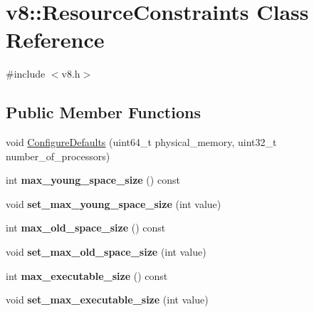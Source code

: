 \hypertarget{classv8_1_1_resource_constraints}{}\section{v8\+:\+:Resource\+Constraints Class Reference}
\label{classv8_1_1_resource_constraints}


{\ttfamily \#include $<$v8.\+h$>$}

\subsection*{Public Member Functions}
\begin{DoxyCompactItemize}
\item 
void \hyperlink{classv8_1_1_resource_constraints_af04f7844940d8d2fb7e5b45606cee30a}{Configure\+Defaults} (uint64\+\_\+t physical\+\_\+memory, uint32\+\_\+t number\+\_\+of\+\_\+processors)
\item 
\hypertarget{classv8_1_1_resource_constraints_a0029d59f46980f02651792eac83bd432}{}int {\bfseries max\+\_\+young\+\_\+space\+\_\+size} () const \label{classv8_1_1_resource_constraints_a0029d59f46980f02651792eac83bd432}

\item 
\hypertarget{classv8_1_1_resource_constraints_abe82f0ef2376266257d3a94b9d4af265}{}void {\bfseries set\+\_\+max\+\_\+young\+\_\+space\+\_\+size} (int value)\label{classv8_1_1_resource_constraints_abe82f0ef2376266257d3a94b9d4af265}

\item 
\hypertarget{classv8_1_1_resource_constraints_a72840efdbcfc7bb287c6aea38d0b07b9}{}int {\bfseries max\+\_\+old\+\_\+space\+\_\+size} () const \label{classv8_1_1_resource_constraints_a72840efdbcfc7bb287c6aea38d0b07b9}

\item 
\hypertarget{classv8_1_1_resource_constraints_aa764be7c76b4baa3fce7a54c3777b5e9}{}void {\bfseries set\+\_\+max\+\_\+old\+\_\+space\+\_\+size} (int value)\label{classv8_1_1_resource_constraints_aa764be7c76b4baa3fce7a54c3777b5e9}

\item 
\hypertarget{classv8_1_1_resource_constraints_a037777e608ed1c22fe294ecef5722036}{}int {\bfseries max\+\_\+executable\+\_\+size} () const \label{classv8_1_1_resource_constraints_a037777e608ed1c22fe294ecef5722036}

\item 
\hypertarget{classv8_1_1_resource_constraints_a37d1b38672e9844c567823a119dcd557}{}void {\bfseries set\+\_\+max\+\_\+executable\+\_\+size} (int value)\label{classv8_1_1_resource_constraints_a37d1b38672e9844c567823a119dcd557}


\end{DoxyCompactItemize}
